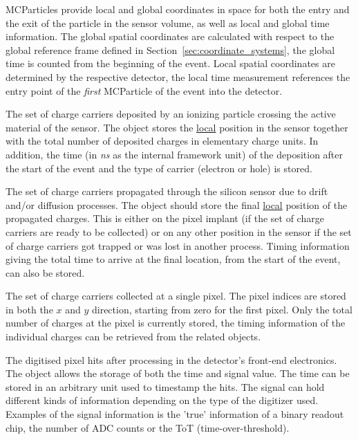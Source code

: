 MCParticles provide local and global coordinates in space for both the entry and the exit of the particle in the sensor volume, as well as local and global time information.
The global spatial coordinates are calculated with respect to the global reference frame defined in Section~\ref{sec:coordinate_systems}, the global time is counted from the beginning of the event.
Local spatial coordinates are determined by the respective detector, the local time measurement references the entry point of the \emph{first} MCParticle of the event into the detector.

The set of charge carriers deposited by an ionizing particle crossing the active material of the sensor.
The object stores the \underline{local} position in the sensor together with the total number of deposited charges in elementary charge units.
In addition, the time (in \textit{ns} as the internal framework unit) of the deposition after the start of the event and the type of carrier (electron or hole) is stored.

The set of charge carriers propagated through the silicon sensor due to drift and/or diffusion processes.
The object should store the final \underline{local} position of the propagated charges.
This is either on the pixel implant (if the set of charge carriers are ready to be collected) or on any other position in the sensor if the set of charge carriers got trapped or was lost in another process.
Timing information giving the total time to arrive at the final location, from the start of the event, can also be stored.

The set of charge carriers collected at a single pixel.
The pixel indices are stored in both the $x$ and $y$ direction, starting from zero for the first pixel.
Only the total number of charges at the pixel is currently stored, the timing information of the individual charges can be retrieved from the related  objects.

The digitised pixel hits after processing in the detector's front-end electronics.
The object allows the storage of both the time and signal value.
The time can be stored in an arbitrary unit used to timestamp the hits.
The signal can hold different kinds of information depending on the type of the digitizer used.
Examples of the signal information is the 'true' information of a binary readout chip, the number of ADC counts or the ToT (time-over-threshold).


